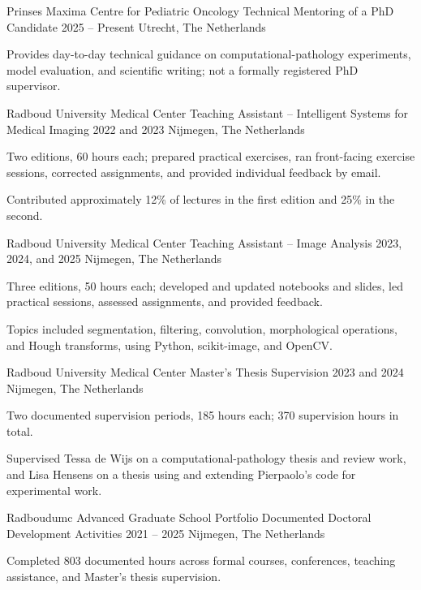 
\begin{cventries}
\cventry
  {Prinses Maxima Centre for Pediatric Oncology}
  {Technical Mentoring of a PhD Candidate}
  {2025 -- Present}
  {Utrecht, The Netherlands}
  {
    \begin{cvitems}
      \item {Provides day-to-day technical guidance on computational-pathology experiments, model evaluation, and scientific writing; not a formally registered PhD supervisor.}
    \end{cvitems}
  }

\cventry
  {Radboud University Medical Center}
  {Teaching Assistant -- Intelligent Systems for Medical Imaging}
  {2022 and 2023}
  {Nijmegen, The Netherlands}
  {
    \begin{cvitems}
      \item {Two editions, 60 hours each; prepared practical exercises, ran front-facing exercise sessions, corrected assignments, and provided individual feedback by email.}
      \item {Contributed approximately 12\% of lectures in the first edition and 25\% in the second.}
    \end{cvitems}
  }

\cventry
  {Radboud University Medical Center}
  {Teaching Assistant -- Image Analysis}
  {2023, 2024, and 2025}
  {Nijmegen, The Netherlands}
  {
    \begin{cvitems}
      \item {Three editions, 50 hours each; developed and updated notebooks and slides, led practical sessions, assessed assignments, and provided feedback.}
      \item {Topics included segmentation, filtering, convolution, morphological operations, and Hough transforms, using Python, scikit-image, and OpenCV.}
    \end{cvitems}
  }

\cventry
  {Radboud University Medical Center}
  {Master's Thesis Supervision}
  {2023 and 2024}
  {Nijmegen, The Netherlands}
  {
    \begin{cvitems}
      \item {Two documented supervision periods, 185 hours each; 370 supervision hours in total.}
      \item {Supervised Tessa de Wijs on a computational-pathology thesis and review work, and Lisa Hensens on a thesis using and extending Pierpaolo's code for experimental work.}
    \end{cvitems}
  }

\cventry
  {Radboudumc Advanced Graduate School Portfolio}
  {Documented Doctoral Development Activities}
  {2021 -- 2025}
  {Nijmegen, The Netherlands}
  {
    \begin{cvitems}
      \item {Completed 803 documented hours across formal courses, conferences, teaching assistance, and Master's thesis supervision.}
    \end{cvitems}
  }
\end{cventries}
